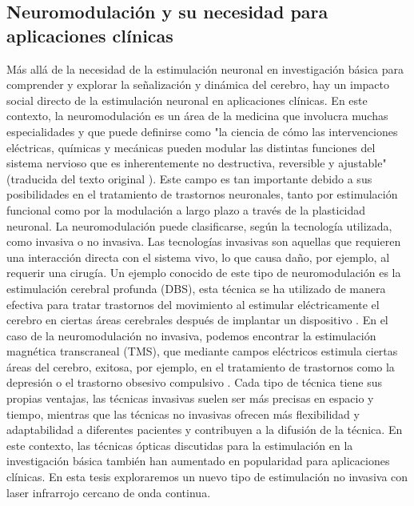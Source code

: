 \subsection{Neuromodulación y su necesidad para aplicaciones clínicas}

Más allá de la necesidad de la estimulación neuronal en investigación básica para comprender y explorar la señalización y dinámica del cerebro, hay un impacto social directo de la estimulación neuronal en aplicaciones clínicas. En este contexto, la neuromodulación es un área de la medicina que involucra muchas especialidades y que puede definirse como "la ciencia de cómo las intervenciones eléctricas, químicas y mecánicas pueden modular las distintas funciones del sistema nervioso que es inherentemente no destructiva, reversible y ajustable" (traducida del texto original \cite{krames_neuromodulation_2009}). Este campo es tan importante debido a sus posibilidades en el tratamiento de trastornos neuronales, tanto por estimulación funcional como por la modulación a largo plazo a través de la plasticidad neuronal. La neuromodulación puede clasificarse, según la tecnología utilizada, como invasiva o no invasiva. Las tecnologías invasivas son aquellas que requieren una interacción directa con el sistema vivo, lo que causa daño, por ejemplo, al requerir una cirugía. Un ejemplo conocido de este tipo de neuromodulación es la estimulación cerebral profunda (DBS), esta técnica se ha utilizado de manera efectiva para tratar trastornos del movimiento al estimular eléctricamente el cerebro en ciertas áreas cerebrales después de implantar un dispositivo \parencite{limousin_longterm_2019, hariz_deep_2022}. En el caso de la neuromodulación no invasiva, podemos encontrar la estimulación magnética transcraneal (TMS), que mediante campos eléctricos estimula ciertas áreas del cerebro, exitosa, por ejemplo, en el tratamiento de  trastornos como la depresión o el trastorno obsesivo compulsivo \parencite{valero-cabre_transcranial_2017, clarke_patients_2018}. Cada tipo de técnica tiene sus propias ventajas, las técnicas invasivas suelen ser más precisas en espacio y tiempo, mientras que las técnicas no invasivas ofrecen más flexibilidad y adaptabilidad a diferentes pacientes y contribuyen a la difusión de la técnica. En este contexto, las técnicas ópticas discutidas para la estimulación en la investigación básica también han aumentado en popularidad para aplicaciones clínicas. En esta tesis exploraremos un nuevo tipo de estimulación no invasiva con laser infrarrojo cercano de onda continua. 
